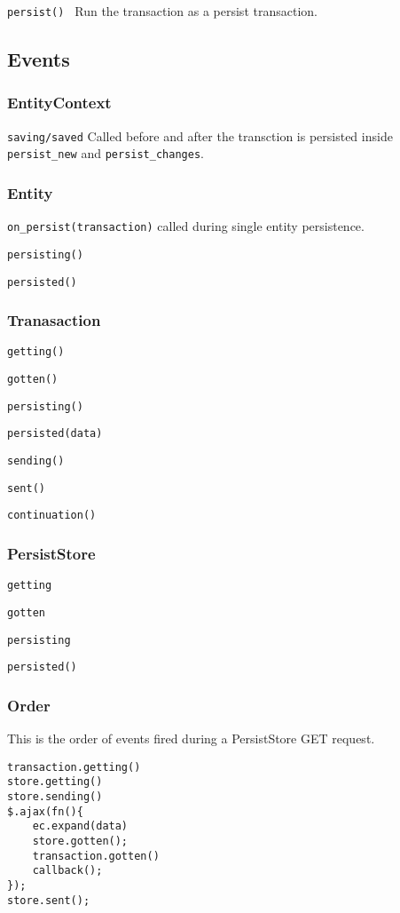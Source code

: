 \documentclass{article}
\begin{document}
	{\tt persist() }
		Run the transaction as a persist transaction.

\subsection{Events}
\subsubsection{EntityContext}
{\tt saving/saved} Called before and after the transction is persisted inside
{\tt persist\_new} and {\tt persist\_changes}.

\subsubsection{Entity}
{\tt on\_persist(transaction)} called during single entity persistence.

{\tt persisting()}

{\tt persisted()}

\subsubsection{Tranasaction}
{\tt getting()}

{\tt gotten()}

{\tt persisting()}

{\tt persisted(data)}

{\tt sending()}

{\tt sent()}

{\tt continuation()}

\subsubsection{PersistStore}
{\tt getting}

{\tt gotten}

{\tt persisting}

{\tt persisted()}

\subsubsection{Order}
This is the order of events fired during a PersistStore GET request.
\linespread{1}
\begin{lstlisting}
transaction.getting()
store.getting()
store.sending()
$.ajax(fn(){
	ec.expand(data)
	store.gotten();
	transaction.gotten()
	callback();
});
store.sent();
\end{lstlisting}
\end{document}
